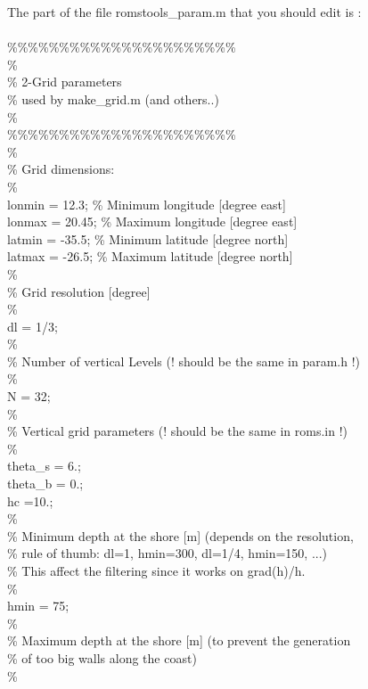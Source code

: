 The part of the file romstools\_param.m that you should edit is :
\\ \\
\%\%\%\%\%\%\%\%\%\%\%\%\%\%\%\%\%\%\%\%\%\%\\
\%\\
\% 2-Grid parameters\\
\%   used by make\_grid.m (and others..)\\
\%\\
\%\%\%\%\%\%\%\%\%\%\%\%\%\%\%\%\%\%\%\%\%\%\\
\%\\
\% Grid dimensions:\\
\%\\
lonmin =  12.3;   \% Minimum longitude [degree east]\\
lonmax = 20.45;   \% Maximum longitude [degree east]\\
latmin = -35.5;   \% Minimum latitude  [degree north]\\
latmax = -26.5;   \% Maximum latitude  [degree north]\\
\%\\
\% Grid resolution [degree]\\
\%\\
dl = 1/3;\\
\%\\
\% Number of vertical Levels (! should be the same in param.h !)\\
\%\\
N = 32;\\
\%\\
\%  Vertical grid parameters (! should be the same in roms.in !)\\
\%\\
theta\_s = 6.;\\
theta\_b = 0.;\\
hc      =10.;\\
\%\\
\% Minimum depth at the shore [m] (depends on the resolution,\\
\% rule of thumb: dl=1, hmin=300, dl=1/4, hmin=150, ...)\\
\% This affect the filtering since it works on grad(h)/h.\\
\%\\
hmin = 75;\\
\%\\
\% Maximum depth at the shore [m] (to prevent the generation\\
\% of too big walls along the coast)\\
\%\\

